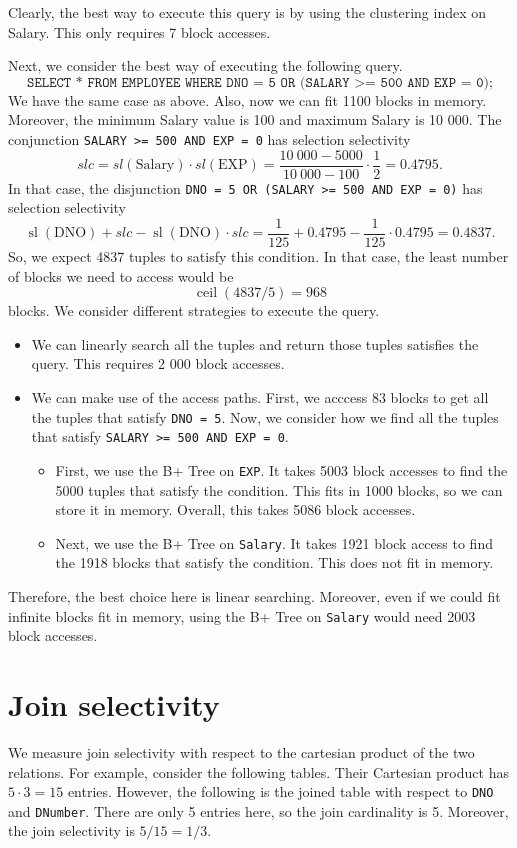 \documentclass[a4paper, openany]{memoir}
\theoremstyle{definition}
\theoremstyle{plain}
\begin{document}
Clearly, the best way to execute this query is by using the clustering index on Salary. This only requires 7 block accesses.

Next, we consider the best way of executing the following query.
\[\texttt{SELECT * FROM EMPLOYEE WHERE DNO = 5 OR (SALARY >= 500 AND EXP = 0);}\]
We have the same case as above. Also, now we can fit 1100 blocks in memory. Moreover, the minimum Salary value is 100 and maximum Salary is 10 000. The conjunction \texttt{SALARY >= 500 AND EXP = 0} has selection selectivity
\[slc = sl(\text{Salary}) \cdot sl(\text{EXP}) = \frac{10 \ 000 - 5000}{10 \ 000 - 100} \cdot \frac{1}{2} = 0.4795.\]
In that case, the disjunction \texttt{DNO = 5 OR (SALARY >= 500 AND EXP = 0)} has selection selectivity
\[\operatorname{sl}(\text{DNO}) + slc - \operatorname{sl}(\text{DNO}) \cdot slc = \frac{1}{125} + 0.4795 - \frac{1}{125} \cdot 0.4795 = 0.4837.\]
So, we expect 4837 tuples to satisfy this condition. In that case, the least number of blocks we need to access would be
\[\operatorname{ceil}(4837/5) = 968\]
blocks. We consider different strategies to execute the query.
\begin{itemize}
    \item We can linearly search all the tuples and return those tuples satisfies the query. This requires 2 000 block accesses.
    \item We can make use of the access paths. First, we acccess 83 blocks to get all the tuples that satisfy \texttt{DNO = 5}. Now, we consider how we find all the tuples that satisfy \texttt{SALARY >= 500 AND EXP = 0}. 
    \begin{itemize}
        \item First, we use the B+ Tree on \texttt{EXP}. It takes 5003 block accesses to find the 5000 tuples that satisfy the condition. This fits in 1000 blocks, so we can store it in memory. Overall, this takes 5086 block accesses.
        \item Next, we use the B+ Tree on \texttt{Salary}. It takes 1921 block access to find the 1918 blocks that satisfy the condition. This does not fit in memory. 
    \end{itemize}
\end{itemize}
Therefore, the best choice here is linear searching. Moreover, even if we could fit infinite blocks fit in memory, using the B+ Tree on \texttt{Salary} would need 2003 block accesses.
\newpage

\section{Join selectivity}
We measure join selectivity with respect to the cartesian product of the two relations. For example, consider the following tables.
Their Cartesian product has $5 \cdot 3 = 15$ entries. However, the following is the joined table with respect to \texttt{DNO} and \texttt{DNumber}.
There are only 5 entries here, so the join cardinality is 5. Moreover, the join selectivity is $5/15 = 1/3$.
\end{document}
